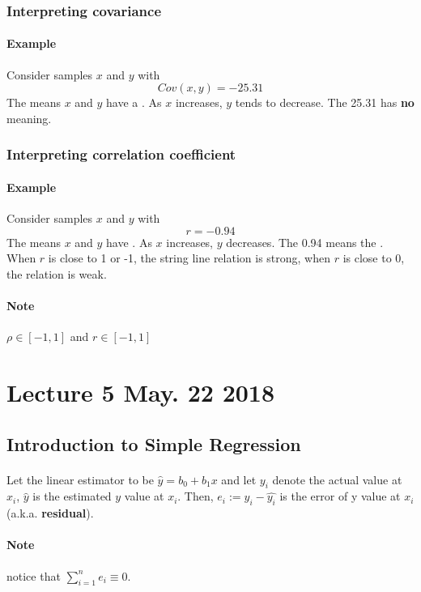 \documentclass{article}
\begin{document}
		\subsubsection{Interpreting covariance}
			\paragraph{Example} Consider samples $x$ and $y$ with
				\[
					Cov(x,y) = -25.31
				\]
			The  means $x$ and $y$ have a . As $x$ increases, $y$ tends to decrease. The  25.31 has \textbf{no} meaning.
			
		\subsubsection{Interpreting correlation coefficient}
			\paragraph{Example} Consider samples $x$ and $y$ with
				\[
					r = -0.94
				\]
			The  means $x$ and $y$ have . As $x$ increases, $y$ decreases. The  0.94 means the . When $r$ is close to 1 or -1, the string line relation is strong, when $r$ is close to 0, the relation is weak.
			\paragraph{Note} $\rho \in [-1, 1]$ and $r \in [-1, 1]$
			
		\section{Lecture 5 May. 22 2018}
		\subsection{Introduction to Simple Regression}
		\paragraph{} Let the linear estimator to be $\hat{y} = b_0 + b_1 x$ and let $y_i$ denote the actual value at $x_i$, $\hat{y}$ is the estimated $y$ value at $x_i$. Then, $e_i := y_i - \hat{y_i}$ is the error of y value at $x_i$ (a.k.a. \textbf{residual}).
		\paragraph{Note} notice that $\sum_{i=1}^n{e_i} \equiv 0$.
\end{document}
